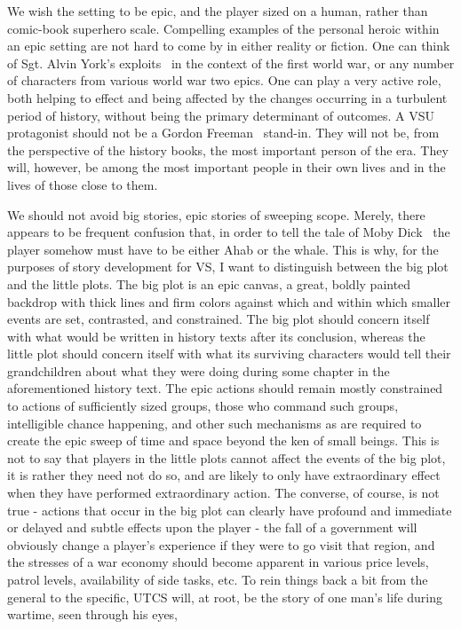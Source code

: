 We wish the setting to be epic, and the player sized on a human,
rather than comic-book superhero scale. Compelling examples of the
personal heroic within an epic setting are not hard to come by in
either reality or fiction. One can think of Sgt. Alvin York's
exploits~\cite{SergeantYork} in the context of the first world war, or
any number of characters from various world war two epics. One can
play a very active role, both helping to effect and being affected by
the changes occurring in a turbulent period of history, without being
the primary determinant of outcomes. A VSU protagonist should not be a
Gordon Freeman~\cite{Half-Life-GordonFreeman} stand-in. They will not
be, from the perspective of the history books, the most important
person of the era. They will, however, be among the most important
people in their own lives and in the lives of those close to them.

We should not avoid big stories, epic stories of sweeping scope. Merely,
there appears to be frequent confusion that, in order to tell the tale
of Moby Dick~\cite{MobyDick} the player somehow must have to be either
Ahab or the whale. This is why, for the purposes of story development
for VS, I want to distinguish between the big plot and the little
plots. The big plot is an epic canvas, a great, boldly painted
backdrop with thick lines and firm colors against which and within
which smaller events are set, contrasted, and constrained. The big
plot should concern itself with what would be written in history texts
after its conclusion, whereas the little plot should concern itself
with what its surviving characters would tell their grandchildren
about what they were doing during some chapter in the aforementioned
history text. The epic actions should remain mostly constrained to
actions of sufficiently sized groups, those who command such groups,
intelligible chance happening, and other such mechanisms as are
required to create the epic sweep of time and space beyond the ken of
small beings. This is not to say that players in the little plots
cannot affect the events of the big plot, it is rather they need not
do so, and are likely to only have extraordinary effect when they have
performed extraordinary action. The converse, of course, is not true -
actions that occur in the big plot can clearly have profound and
immediate or delayed and subtle effects upon the player - the fall of
a government will obviously change a player's experience if they were
to go visit that region, and the stresses of a war economy should
become apparent in various price levels, patrol levels, availability of
side tasks, etc. To rein things back a bit from the general to the
specific, UTCS will, at root, be the story of one man's life during
wartime, seen through his eyes,

